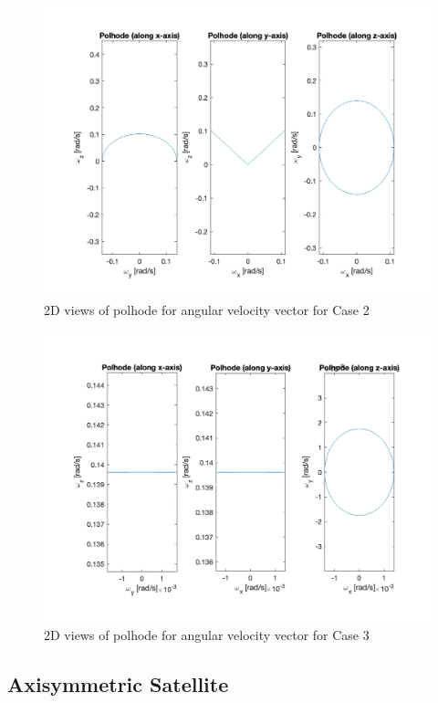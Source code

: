 \begin{figure}[H]
\centering
\includegraphics[scale=0.6]{Images/ps2_problem9_p8_y.png}
\caption{2D views of polhode for angular velocity vector for Case 2}
\label{fig:ps2_problem9_p8_y}
\end{figure}

\begin{figure}[H]
\centering
\includegraphics[scale=0.6]{Images/ps2_problem9_p8_z.png}
\caption{2D views of polhode for angular velocity vector for Case 3}
\label{fig:ps2_problem9_p8_z}
\end{figure}

\newpage
\subsection{Axisymmetric Satellite}

